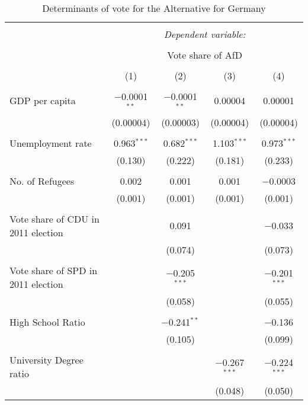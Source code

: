 \documentclass[10pt,a4paper]{article}
\author{Md Mujahedul Islam}
\begin{document}
\begin{table}[!htbp] \centering 
  \caption{Determinants of vote for the Alternative for Germany} 
  \label{AfD_voteshare} 
\small 
\begin{tabular}{@{\extracolsep{5pt}}lcccc} 
\\[-1.8ex]\hline 
\hline \\[-1.8ex] 
 & \multicolumn{4}{c}{\textit{Dependent variable:}} \\ 
\cline{2-5} 
\\[-1.8ex] & \multicolumn{4}{c}{Vote share of AfD} \\ 
\\[-1.8ex] & (1) & (2) & (3) & (4)\\ 
\hline \\[-1.8ex] 
 GDP per capita & $-$0.0001$^{**}$ & $-$0.0001$^{**}$ & 0.00004 & 0.00001 \\ 
  & (0.00004) & (0.00003) & (0.00004) & (0.00004) \\ 
  & & & & \\ 
 Unemployment rate & 0.963$^{***}$ & 0.682$^{***}$ & 1.103$^{***}$ & 0.973$^{***}$ \\ 
  & (0.130) & (0.222) & (0.181) & (0.233) \\ 
  & & & & \\ 
 No. of Refugees & 0.002 & 0.001 & 0.001 & $-$0.0003 \\ 
  & (0.001) & (0.001) & (0.001) & (0.001) \\ 
  & & & & \\ 
 Vote share of CDU in 2011 election &  & 0.091 &  & $-$0.033 \\ 
  &  & (0.074) &  & (0.073) \\ 
  & & & & \\ 
 Vote share of SPD in 2011 election &  & $-$0.205$^{***}$ &  & $-$0.201$^{***}$ \\ 
  &  & (0.058) &  & (0.055) \\ 
  & & & & \\ 
 High School Ratio &  & $-$0.241$^{**}$ &  & $-$0.136 \\ 
  &  & (0.105) &  & (0.099) \\ 
  & & & & \\ 
 University Degree ratio &  &  & $-$0.267$^{***}$ & $-$0.224$^{***}$ \\ 
  &  &  & (0.048) & (0.050) \\ 

\end{tabular}
\end{table}
\end{document}
